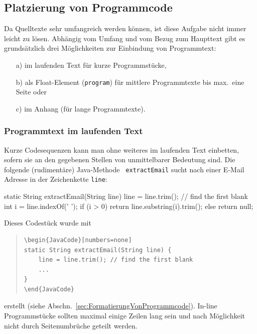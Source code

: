 \subsection{Platzierung von Programmcode}

Da Quelltexte sehr umfangreich werden können, ist diese Aufgabe nicht
immer leicht zu lösen. Abhängig vom Umfang und vom Bezug zum Haupttext
gibt es grundsätzlich drei Möglichkeiten zur Einbindung von Programmtext:
%
\begin{itemize}
\item[a)] im laufenden Text für kurze Programmstücke,
\item[b)] als Float-Element (\texttt{program}) für mittlere Programmtexte bis max.\ eine Seite oder
\item[c)] im Anhang (für lange Programmtexte).
\end{itemize}

\subsubsection{Programmtext im laufenden Text}

Kurze Codesequenzen kann man ohne weiteres im laufenden Text
einbetten, sofern sie an den gegebenen Stellen von unmittelbarer
Bedeutung sind. Die folgende (rudimentäre) Java-Methode {\tt
extractEmail} sucht nach einer E-Mail Adresse in der Zeichenkette
\texttt{line}:
%
\begin{JavaCode}[numbers=none]
static String extractEmail(String line) {
    line = line.trim(); // find the first blank
    int i = line.indexOf(' '); 
    if (i > 0)
        return line.substring(i).trim();
    else
        return null;
}
\end{JavaCode}
\medskip

\noindent
Dieses Codestück wurde mit 
%
\begin{quote}
\begin{verbatim}
\begin{JavaCode}[numbers=none]
static String extractEmail(String line) {
    line = line.trim(); // find the first blank
    ...
}
\end{JavaCode}
\end{verbatim}
\end{quote}
%
erstellt (siehe Abschn.\ \ref{sec:FormatierungVonProgrammcode}). 
In-line Programmstücke sollten maximal einige Zeilen lang sein und 
nach Möglichkeit nicht durch Seitenumbrüche geteilt werden.


